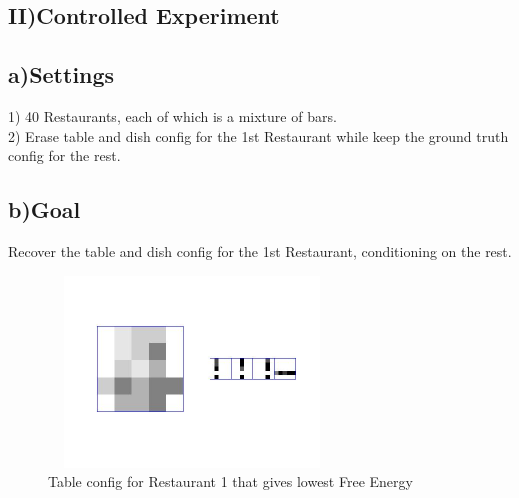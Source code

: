 \documentclass{article}
\begin{document}
\begin{spacing}{1.1}
\section{II)Controlled Experiment}
\subsection{a)Settings}
1) 40 Restaurants, each of which is a mixture of bars.\\
2) Erase table and dish config for the 1st Restaurant while keep the ground truth config for the rest.
\subsection{b)Goal}
Recover the table and dish config for the 1st Restaurant, conditioning on the rest.
\begin{figure}
    \centering 
    \includegraphics[width=3in,height=2in]{gt.jpg} 
    \caption{Table config for Restaurant 1 that gives lowest Free Energy}
\end{figure}


\end{spacing}
\end{document}
